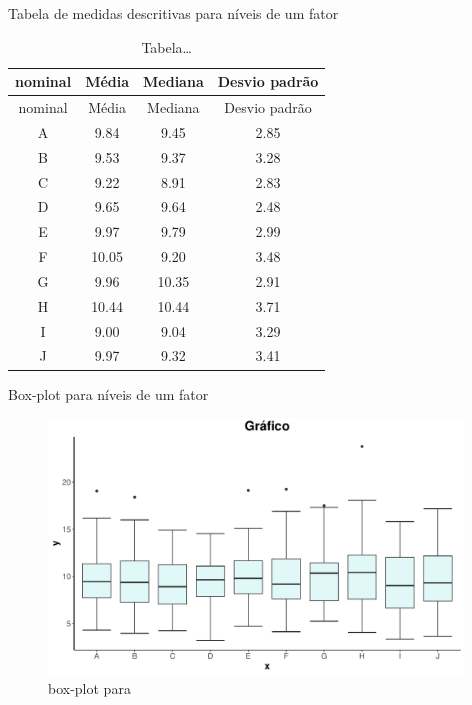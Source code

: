 \documentclass[
  ignorenonframetext,
  serif,
  professionalfont,
  usenames,
  dvipsnames,
  aspectratio = 169]{beamer}
\begin{document}
\begin{frame}{Tabela de medidas descritivas para níveis de um fator}
\protect\hypertarget{tabela-de-medidas-descritivas-para-nuxedveis-de-um-fator}{}
\begin{longtable}[]{@{}cccc@{}}
\caption{Tabela\ldots{}}\tabularnewline
\toprule()
nominal & Média & Mediana & Desvio padrão \\
\midrule()
\endfirsthead
\toprule()
nominal & Média & Mediana & Desvio padrão \\
\midrule()
\endhead
A & 9.84 & 9.45 & 2.85 \\
B & 9.53 & 9.37 & 3.28 \\
C & 9.22 & 8.91 & 2.83 \\
D & 9.65 & 9.64 & 2.48 \\
E & 9.97 & 9.79 & 2.99 \\
F & 10.05 & 9.20 & 3.48 \\
G & 9.96 & 10.35 & 2.91 \\
H & 10.44 & 10.44 & 3.71 \\
I & 9.00 & 9.04 & 3.29 \\
J & 9.97 & 9.32 & 3.41 \\
\bottomrule()
\end{longtable}
\end{frame}

\begin{frame}{Box-plot para níveis de um fator}
\protect\hypertarget{box-plot-para-nuxedveis-de-um-fator}{}
\begin{figure}

{\centering \includegraphics[width=11cm]{202-exploratoria-bivariada_files/figure-beamer/unnamed-chunk-14-1} 

}

\caption{box-plot para}\label{fig:unnamed-chunk-14}
\end{figure}
\end{frame}
\end{document}
